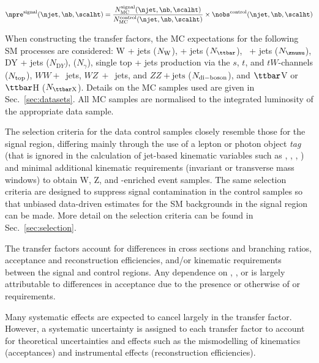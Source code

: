 \begin{equation}
  \label{equ:pred-method}
  \npre^{\rm signal}(\njet,\nb,\scalht) = \frac{N_{\rm MC}^{\rm
      signal}(\njet,\nb,\scalht)}{N_{\rm MC}^{\rm
      control}(\njet,\nb,\scalht)} \times \nobs^{\rm
    control}(\njet,\nb,\scalht)   
\end{equation}

When constructing the transfer factors, the MC expectations for the
following SM processes are considered: W + jets ($N_{\rm W}$), \ttbar
+ jets ($N_{\ttbar}$), \znunu\ + jets ($N_{\znunu}$), DY + jets
($N_{\mathrm DY}$), \gj ($N_\gamma$), single top + jets
production via the $s$, $t$, and $tW$-channels ($N_{\rm top}$), $WW+$~jets, $WZ~+$~jets, and $ZZ + \textrm{jets}$ ($N_{\rm di-boson}$), and $\ttbar$V or
$\ttbar$H ($N_{\rm {\ttbar}X}$). Details on the MC
samples used are given in Sec.~\ref{sec:datasets}. All MC samples
are normalised to the integrated luminosity of the appropriate data
sample.

The selection criteria for the data control samples closely resemble
those for the signal region, differing mainly through the use of a
lepton or photon object {\it tag} (that is ignored in the calculation
of jet-based kinematic variables such as \scalht, \mht, \alphat, \etc)
and minimal additional kinematic requirements (\eg invariant or
transverse mass windows) to obtain W, Z, and \ttbar-enriched event
samples. The same selection criteria are designed to suppress signal
contamination in the control samples so that unbiased data-driven
estimates for the SM backgrounds in the signal region can be
made. More detail on the selection criteria can be found in Sec.~\ref{sec:selection}.

The transfer factors account for differences in cross sections and
branching ratios, acceptance and reconstruction efficiencies, and/or
kinematic requirements between the signal and control regions. Any
dependence on \njet, \nb, or \HT is largely attributable to
differences in acceptance due to the presence or otherwise of \alphat
or \mht requirements.

Many systematic effects are expected to cancel largely in the transfer
factor. However, a systematic uncertainty is assigned to each transfer
factor to account for theoretical uncertainties and effects such as
the mismodelling of kinematics (\eg acceptances) and instrumental
effects (\eg reconstruction efficiencies).

